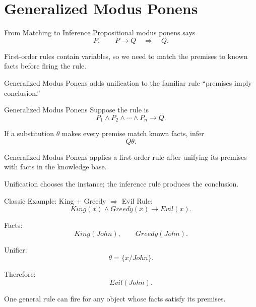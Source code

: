 \documentclass[aspectratio=169,10pt]{beamer}
\begin{document}
\section{Generalized Modus Ponens}

\begin{frame}[shrink=10]{From Matching to Inference}
  Propositional modus ponens says
  \[
    P,
    \qquad
    P\rightarrow Q
    \quad\Longrightarrow\quad
    Q.
  \]

  First-order rules contain variables, so we need to match the premises to known facts before firing the rule.

  \begin{keyidea}
    Generalized Modus Ponens adds unification to the familiar rule ``premises imply conclusion.''
  \end{keyidea}
\end{frame}

\begin{frame}[shrink=10]{Generalized Modus Ponens}
  Suppose the rule is
  \[
    P_1 \land P_2 \land \cdots \land P_n \rightarrow Q.
  \]

  If a substitution $\theta$ makes every premise match known facts, infer
  \[
    Q\theta.
  \]

  \begin{cpdefinition}
    Generalized Modus Ponens applies a first-order rule after unifying its premises with facts in the knowledge base.
  \end{cpdefinition}

  \begin{keyidea}
    Unification chooses the instance; the inference rule produces the conclusion.
  \end{keyidea}
\end{frame}

\begin{frame}[shrink=10]{Classic Example: King + Greedy $\Rightarrow$ Evil}
  Rule:
  \[
    King(x) \land Greedy(x) \rightarrow Evil(x).
  \]

  Facts:
  \[
    King(John),
    \qquad
    Greedy(John).
  \]

  Unifier:
  \[
    \theta = \{x/John\}.
  \]

  Therefore:
  \[
    Evil(John).
  \]

  \begin{keyidea}
    One general rule can fire for any object whose facts satisfy its premises.
  \end{keyidea}
\end{frame}
\end{document}
